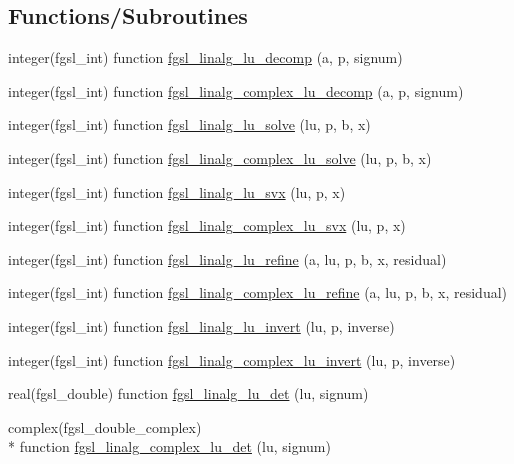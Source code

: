 \subsection*{Functions/\-Subroutines}
\begin{DoxyCompactItemize}
\item 
integer(fgsl\-\_\-int) function \hyperlink{linalg_8finc_a121a7317ed9ff3908280670e9df43236}{fgsl\-\_\-linalg\-\_\-lu\-\_\-decomp} (a, p, signum)
\item 
integer(fgsl\-\_\-int) function \hyperlink{linalg_8finc_a0bbccda0d445fb8052f75de6f816b0ce}{fgsl\-\_\-linalg\-\_\-complex\-\_\-lu\-\_\-decomp} (a, p, signum)
\item 
integer(fgsl\-\_\-int) function \hyperlink{linalg_8finc_a79f7596727c6fd25fae6dcc5f519a8d7}{fgsl\-\_\-linalg\-\_\-lu\-\_\-solve} (lu, p, b, x)
\item 
integer(fgsl\-\_\-int) function \hyperlink{linalg_8finc_ad5c7f8769c7bc735e77db729b4355e76}{fgsl\-\_\-linalg\-\_\-complex\-\_\-lu\-\_\-solve} (lu, p, b, x)
\item 
integer(fgsl\-\_\-int) function \hyperlink{linalg_8finc_a79df0025823e3de429baa1263db76d21}{fgsl\-\_\-linalg\-\_\-lu\-\_\-svx} (lu, p, x)
\item 
integer(fgsl\-\_\-int) function \hyperlink{linalg_8finc_afdedc295a99655df475285c0e01407bb}{fgsl\-\_\-linalg\-\_\-complex\-\_\-lu\-\_\-svx} (lu, p, x)
\item 
integer(fgsl\-\_\-int) function \hyperlink{linalg_8finc_aaf17561bd36bb884526bebfc9696558b}{fgsl\-\_\-linalg\-\_\-lu\-\_\-refine} (a, lu, p, b, x, residual)
\item 
integer(fgsl\-\_\-int) function \hyperlink{linalg_8finc_a6303f3ab1b96b8841f7cbcc7291bd79c}{fgsl\-\_\-linalg\-\_\-complex\-\_\-lu\-\_\-refine} (a, lu, p, b, x, residual)
\item 
integer(fgsl\-\_\-int) function \hyperlink{linalg_8finc_ae2390785aa3a33f1619b793bf2caecad}{fgsl\-\_\-linalg\-\_\-lu\-\_\-invert} (lu, p, inverse)
\item 
integer(fgsl\-\_\-int) function \hyperlink{linalg_8finc_a3df5d0ceea88fa0a7675a6a75e749e76}{fgsl\-\_\-linalg\-\_\-complex\-\_\-lu\-\_\-invert} (lu, p, inverse)
\item 
real(fgsl\-\_\-double) function \hyperlink{linalg_8finc_a2f5f7d668125b203b30bcce6415e5cc4}{fgsl\-\_\-linalg\-\_\-lu\-\_\-det} (lu, signum)
\item 
complex(fgsl\-\_\-double\-\_\-complex) \\*
function \hyperlink{linalg_8finc_a4b7c1ddb2195cc26e8040ac0bae5b957}{fgsl\-\_\-linalg\-\_\-complex\-\_\-lu\-\_\-det} (lu, signum)

\end{DoxyCompactItemize}
